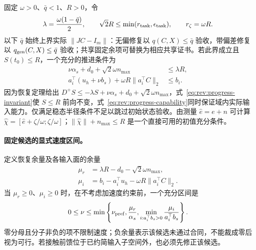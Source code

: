 \documentclass[11pt,a4paper]{article}
\numberwithin{equation}{section}
\theoremstyle{definition}
\begin{document}
固定 $\omega>0$、$\bar q<1$、$R>0$，令
\begin{equation}
 \lambda=\frac{\omega(1-\bar q)}2,\qquad
 \sqrt2R\le\min(r_{\rm task},\epsilon_{\rm task}),\qquad
 r_\zeta=\omega R.
 \label{eq:rev:progress-radius}
\end{equation}
以下 $\bar q$ 始终上界实际 $\|JC-I_m\|$：无偏修复以 $q(C,X)\le\bar q$ 验收，带偏差修复以 $q_{\rm gen}(C,X)\le\bar q$ 验收；共享固定余项可替换为相应共享证书。若此界成立且 $S(t_0)\le R$，一个充分的推进条件为
\begin{align}
 \nu\alpha_s+d_0+\sqrt2\omega n_{\max}&\le\lambda R,
 \label{eq:rev:progress-invariant}\\
 a_i^\top(u_h+\nu b_s)+\omega R\|a_i^\top C\|_2
&\le b_i.
 \label{eq:rev:progress-capability}
\end{align}
因为恢复定理给出 $D^+S\le-\lambda S+\nu\alpha_s+d_0+\sqrt2\omega n_{\max}$，式~\eqref{eq:rev:progress-invariant}使 $S\le R$ 前向不变，式~\eqref{eq:rev:progress-capability}同时保证域内实际输入能力。仅满足稳态半径条件不足以跳过初始状态验收。由测量 $\widehat e=e+n$ 可计算 $\widehat\chi=[\widehat e+\zeta/\omega;\zeta/\omega]$；$\|\widehat\chi\|+n_{\max}\le R$ 是一个直接可用的初值充分条件。

\paragraph{固定候选的显式速度区间。}
定义恢复余量及各输入面的余量
\begin{align}
 \mu_r&=\lambda R-d_0-\sqrt2\omega n_{\max},\\
 \mu_i&=b_i-a_i^\top u_h-\omega R\|a_i^\top C\|_2
.
 \label{eq:rev:progress-margins}
\end{align}
当 $\mu_r\ge0$、$\mu_i\ge0$ 时，在不考虑加速度约束前，一个充分区间是
\begin{equation}
 0\le\nu\le
 \min\left\{\nu_{\rm pref},
 \frac{\mu_r}{\alpha_s},
 \min_{i:a_i^\top b_s>0}\frac{\mu_i}{a_i^\top b_s}\right\}.
 \label{eq:rev:progress-upper}
\end{equation}
零分母且分子非负的项不限制速度；负余量表示该候选未通过合同，不能裁成零后视为可行。若接触前馈位于已约简输入子空间外，也必须先修正该候选。
\end{document}

